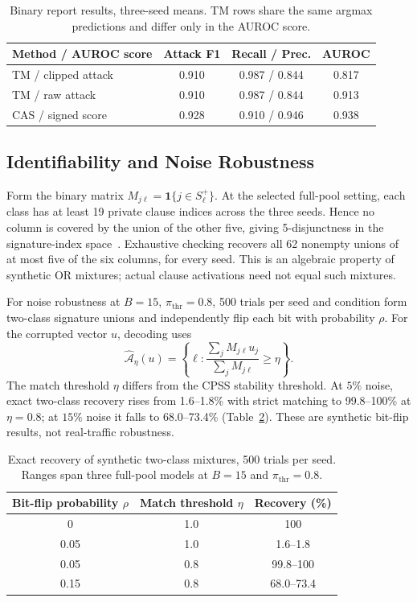 \documentclass[conference]{IEEEtran}
\begin{document}
\begin{table}[!htb]
\centering
\caption{Binary report results, three-seed means. TM rows share
the same argmax predictions and differ only in the AUROC score.}
\label{tab:binary}
\footnotesize
\begin{tabular}{@{}lccc@{}}
\toprule
Method / AUROC score & Attack F1 & Recall / Prec. & AUROC \\
\midrule
TM / clipped attack & 0.910 & 0.987 / 0.844 & 0.817 \\
TM / raw attack & 0.910 & 0.987 / 0.844 & 0.913 \\
CAS / signed score & 0.928 & 0.910 / 0.946 & 0.938 \\
\bottomrule
\end{tabular}
\end{table}

\subsection{Identifiability and Noise Robustness}
\label{sec:disjunct}
Form the binary matrix $M_{j\ell}=\mathbf1\{j\in S_\ell^+\}$.
At the selected full-pool setting, each class has at least 19
private clause indices across the three seeds. Hence no column is
covered by the union of the other five, giving 5-disjunctness in
the signature-index space~\cite{du1993}. Exhaustive checking recovers
all 62 nonempty unions of at most five of the six columns, for
every seed. This is an algebraic property of synthetic OR mixtures;
actual clause activations need not equal such mixtures.

For noise robustness at $B=15$, $\pi_{\mathrm{thr}}=0.8$,
500 trials per seed and condition form two-class signature unions
and independently flip each bit with probability $\rho$.
For the corrupted vector $u$, decoding uses
\begin{equation}
 \widehat{\mathcal A}_\eta(u)=
 \left\{\ell:\frac{\sum_j M_{j\ell}u_j}{\sum_j M_{j\ell}}
                              \ge\eta\right\}.
 \label{eq:noisydecode}
\end{equation}
The match threshold $\eta$ differs from the CPSS stability threshold.
At $5\%$ noise, exact two-class recovery rises from 1.6--1.8\%
with strict matching to 99.8--100\% at $\eta=0.8$;
at $15\%$ noise it falls to 68.0--73.4\% (Table~\ref{tab:noise}).
These are synthetic bit-flip results, not real-traffic robustness.

\begin{table}[!htb]
\centering
\caption{Exact recovery of synthetic two-class mixtures, 500 trials
per seed. Ranges span three full-pool models at $B=15$ and
$\pi_{\mathrm{thr}}=0.8$.}
\label{tab:noise}
\footnotesize
\begin{tabular}{@{}ccc@{}}
\toprule
Bit-flip probability $\rho$ & Match threshold $\eta$ & Recovery (\%) \\
\midrule
0 & 1.0 & 100 \\
0.05 & 1.0 & 1.6--1.8 \\
0.05 & 0.8 & 99.8--100 \\
0.15 & 0.8 & 68.0--73.4 \\
\bottomrule
\end{tabular}
\end{table}
\end{document}
